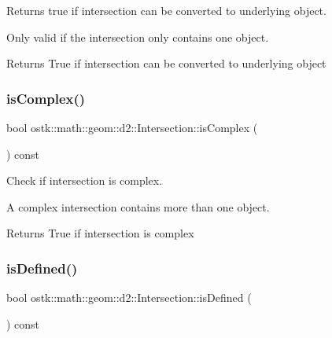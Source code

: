 Returns true if intersection can be converted to underlying object. 

Only valid if the intersection only contains one object.

\begin{DoxyReturn}{Returns}
True if intersection can be converted to underlying object 
\end{DoxyReturn}
\mbox{\label{classostk_1_1math_1_1geom_1_1d2_1_1_intersection_ab96bffd7f10fe4f4706a152bed047824}} 
\subsubsection{\texorpdfstring{is\+Complex()}{isComplex()}}
{\footnotesize\ttfamily bool ostk\+::math\+::geom\+::d2\+::\+Intersection\+::is\+Complex (\begin{DoxyParamCaption}{ }\end{DoxyParamCaption}) const}



Check if intersection is complex. 

A complex intersection contains more than one object.

\begin{DoxyReturn}{Returns}
True if intersection is complex 
\end{DoxyReturn}
\mbox{\label{classostk_1_1math_1_1geom_1_1d2_1_1_intersection_a355d38c09db6be9f055e6516f78b5ecc}} 
\subsubsection{\texorpdfstring{is\+Defined()}{isDefined()}}
{\footnotesize\ttfamily bool ostk\+::math\+::geom\+::d2\+::\+Intersection\+::is\+Defined (\begin{DoxyParamCaption}{ }\end{DoxyParamCaption}) const}



